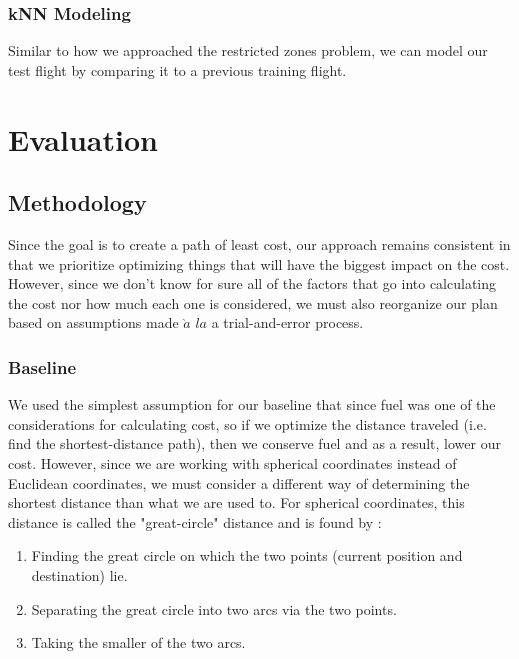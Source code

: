 \documentclass{article}[12pt]
\begin{document}
\begin{multicols}{2}
\subsubsection{kNN Modeling}

Similar to how we approached the restricted zones problem, we can model our test flight by comparing it to a previous training flight. 

\section{Evaluation}
\subsection{Methodology}
Since the goal is to create a path of least cost, our approach remains consistent in that we prioritize optimizing things that will have the biggest impact on the cost. However, since we don't know for sure all of the factors that go into calculating the cost nor how much each one is considered, we must also reorganize our plan based on assumptions made $\grave{a}$ $la$ a trial-and-error process.

\subsubsection{Baseline}

We used the simplest assumption for our baseline that since fuel was one of the considerations for calculating cost, so if we optimize the distance traveled (i.e. find the shortest-distance path), then we conserve fuel and as a result, lower our cost. However, since we are working with spherical coordinates instead of Euclidean coordinates, we must consider a different way of determining the shortest distance than what we are used to. For spherical coordinates, this distance is called the "great-circle" distance and is found by \cite{wiki}:\\

	\begin{enumerate}
		\item Finding the great circle on which the two points (current position and destination) lie.
		\item Separating the great circle into two arcs via the two points. 
		\item Taking the smaller of the two arcs.\\
	\end{enumerate}


\end{multicols}
\end{document}
